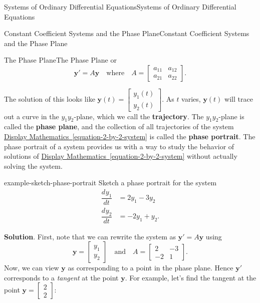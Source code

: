 \documentclass[10pt,]{book}
\newcommand{\terminology}[1]{\textbf{#1}}
\numberwithin{equation}{section}
\renewcommand{\vec}[1]{\mathbf{#1}}
\newcommand{\dv}[3][]{\dfrac{d^{#1} #2}{d #3^{#1}}}
\newcommand{\amp}{&}
\begin{document}
\begin{chapterptx}{Systems of Ordinary Differential Equations}{}{Systems of Ordinary Differential Equations}{}{}
\begin{sectionptx}{Constant Coefficient Systems and the Phase Plane}{}{Constant Coefficient Systems and the Phase Plane}{}{}
\begin{subsectionptx}{The Phase Plane}{}{The Phase Plane}{}{}
or%
\begin{equation*}
\vec{y}' = A\vec{y}\quad\text{where}\quad A = \begin{bmatrix}a_{11}  \amp  a_{12}  \\  a_{21}  \amp  a_{22}\end{bmatrix}.
\end{equation*}
%
\par
\hypertarget{p-368}{}%
The solution of this looks like \(\vec{y}(t) = \begin{bmatrix}y_{1}(t) \\ y_{2}(t)\end{bmatrix}\). As \(t\) varies, \(\vec{y}(t)\) will trace out a curve in the \(y_{1}y_{2}\)-plane, which we call the \terminology{trajectory}. The \(y_{1}y_{2}\)-plane is called the \terminology{phase plane}, and the collection of all trajectories of the system \hyperref[equation-2-by-2-system]{Display Mathematics~\ref{equation-2-by-2-system}} is called the \terminology{phase portrait}. The phase portrait of a system provides us with a way to study the behavior of solutions of \hyperref[equation-2-by-2-system]{Display Mathematics~\ref{equation-2-by-2-system}} without actually solving the system.%
\begin{example}{}{example-sketch-phase-portrait}%
\hypertarget{p-369}{}%
Sketch a phase portrait for the system%
\begin{align*}
\dv{y_{1}}{t}  \amp =  2y_{1} - 3y_{2}\\
\dv{y_{2}}{t}  \amp =  -2y_{1} + y_{2}.
\end{align*}
%
\par\smallskip%
\noindent\textbf{Solution}.\hypertarget{solution-59}{}\quad%
\hypertarget{p-370}{}%
First, note that we can rewrite the system as \(\vec{y}' = A\vec{y}\) using%
\begin{equation*}
\vec{y} = \begin{bmatrix}y_{1}\\y_{2}\end{bmatrix}\quad\text{and}\quad A = \begin{bmatrix}2 \amp  -3 \\-2 \amp  1\end{bmatrix}.
\end{equation*}
Now, we can view \(\vec{y}\) as corresponding to a point in the phase plane. Hence \(\vec{y}'\) corresponds to a \emph{tangent} at the point \(\vec{y}\). For example, let's find the tangent at the point \(\vec{y} = \begin{bmatrix}2\\2\end{bmatrix}\):%

\end{example}
\end{subsectionptx}
\end{sectionptx}
\end{chapterptx}
\end{document}

